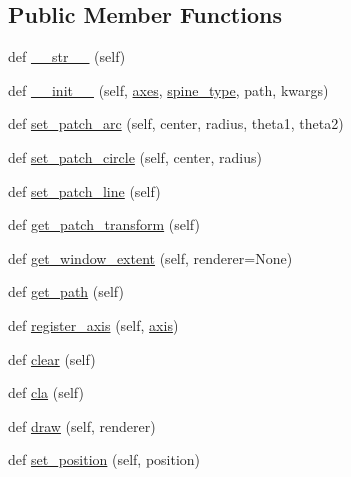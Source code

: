 \subsection*{Public Member Functions}
\begin{DoxyCompactItemize}
\item 
def \hyperlink{classmatplotlib_1_1spines_1_1Spine_aa2d07d1d4a22717d2b73d8d8ca7dd0f8}{\+\_\+\+\_\+str\+\_\+\+\_\+} (self)
\item 
def \hyperlink{classmatplotlib_1_1spines_1_1Spine_a28cc2ac541537c952dd996d118f8ec43}{\+\_\+\+\_\+init\+\_\+\+\_\+} (self, \hyperlink{classmatplotlib_1_1spines_1_1Spine_ae26d71c41d1ef631eb7597043354aa97}{axes}, \hyperlink{classmatplotlib_1_1spines_1_1Spine_abb817da882414260900608ca76c1188a}{spine\+\_\+type}, path, kwargs)
\item 
def \hyperlink{classmatplotlib_1_1spines_1_1Spine_a1fbe5a277ef167582b7f1a90b96cce12}{set\+\_\+patch\+\_\+arc} (self, center, radius, theta1, theta2)
\item 
def \hyperlink{classmatplotlib_1_1spines_1_1Spine_af63fb075ad1bc87d4d65567ac02479f7}{set\+\_\+patch\+\_\+circle} (self, center, radius)
\item 
def \hyperlink{classmatplotlib_1_1spines_1_1Spine_aea89c1a6d5bbd16c7950c5bcf3d225ef}{set\+\_\+patch\+\_\+line} (self)
\item 
def \hyperlink{classmatplotlib_1_1spines_1_1Spine_a00d7f7e9929b15e1033c7f2a8a7422de}{get\+\_\+patch\+\_\+transform} (self)
\item 
def \hyperlink{classmatplotlib_1_1spines_1_1Spine_ab2675de545d18f94b65987723d19e0ac}{get\+\_\+window\+\_\+extent} (self, renderer=None)
\item 
def \hyperlink{classmatplotlib_1_1spines_1_1Spine_acf1338a490c27f1393fd38b70e00a8ca}{get\+\_\+path} (self)
\item 
def \hyperlink{classmatplotlib_1_1spines_1_1Spine_a30131be5f0620f9ba175898d3010fb95}{register\+\_\+axis} (self, \hyperlink{classmatplotlib_1_1spines_1_1Spine_afa70f77dfe170ddd16528b4be0561194}{axis})
\item 
def \hyperlink{classmatplotlib_1_1spines_1_1Spine_ab5fae9047edbb349842af8456bf21c29}{clear} (self)
\item 
def \hyperlink{classmatplotlib_1_1spines_1_1Spine_a67290d8a6759bbf3c31f94d6df53ce91}{cla} (self)
\item 
def \hyperlink{classmatplotlib_1_1spines_1_1Spine_ad3ca31c2b0d640646b2ec6439d0492d6}{draw} (self, renderer)
\item 
def \hyperlink{classmatplotlib_1_1spines_1_1Spine_a5407626df4bb1a1522c721c65345d71e}{set\+\_\+position} (self, position)

\end{DoxyCompactItemize}
